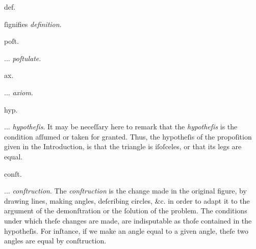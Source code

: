 \begin{minipage}[t]{0.20\textwidth}
  \begin{center}
    def.
  \end{center}
\end{minipage}
\begin{minipage}[t]{0.80\textwidth}
  ſignifies \textit{definition}.
\end{minipage}

\begin{minipage}[t]{0.20\textwidth}
  \begin{center}
    poſt.
  \end{center}
\end{minipage}
\begin{minipage}[t]{0.80\textwidth}
  $\ldots$ \textit{poſtulate}.
\end{minipage}

\begin{minipage}[t]{0.20\textwidth}
  \begin{center}
    ax.
  \end{center}
\end{minipage}
\begin{minipage}[t]{0.80\textwidth}
  $\ldots$ \textit{axiom}.
\end{minipage}

\begin{minipage}[t]{0.20\textwidth}
  \begin{center}
    hyp.
  \end{center}
\end{minipage}
\begin{minipage}[t]{0.80\textwidth}
  $\ldots$ \textit{hypotheſis}. It may be neceſſary here to remark that the \textit{hypotheſis} is the condition aſſumed or taken for granted. Thus, the hypotheſis of the propoſition given in the Introduction, is that the triangle is iſoſceles, or that its legs are equal.
\end{minipage}

\begin{minipage}[t]{0.20\textwidth}
  \begin{center}
    conſt.
  \end{center}
\end{minipage}
\begin{minipage}[t]{0.80\textwidth}
  $\ldots$ \textit{conſtruction}. The \textit{conſtruction} is the change made in the original figure, by drawing lines, making angles, deſcribing circles, \&c. in order to adapt it to the argument of the demonſtration or the ſolution of the problem. The conditions under which theſe changes are made, are indisputable as thoſe contained in the hypotheſis. For inſtance, if we make an angle equal to a given angle, theſe two angles are equal by conſtruction.
\end{minipage}

